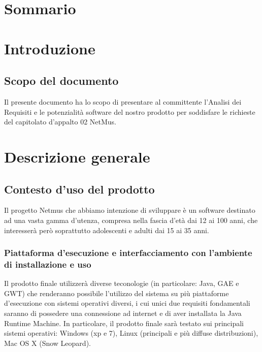 \tableofcontents
\thispagestyle{fancy} %


\chapter*{Sommario}


\thispagestyle{fancy} %

\chapter{Introduzione}
\thispagestyle{fancy} %

\section{Scopo del documento}
Il presente documento ha lo scopo di presentare al committente l'Analisi dei
Requisiti e le potenzialit\`a software del nostro prodotto per soddisfare le
richieste del capitolato d'appalto 02 NetMus.



\chapter{Descrizione generale}
\section{Contesto d'uso del prodotto}
Il progetto Netmus che abbiamo intenzione di sviluppare \`e un software
destinato ad una vasta gamma d'utenza, compresa nella fascia d'et\`a dai 12 ai
100 anni, che interesser\`a per\`o soprattutto adolescenti e adulti dai 15 ai 35 anni.
\subsection{Piattaforma d'esecuzione e interfacciamento con l'ambiente di
installazione e uso}
Il prodotto finale utilizzer\`a diverse teconologie (in particolare: Java, GAE e
GWT) che renderanno possibile l'utilizzo del sistema su pi\`u piattaforme
d'esecuzione con sistemi operativi diversi, i cui unici due requisiti
fondamentali saranno di possedere una connessione ad internet e di aver
installata la Java Runtime Machine. In particolare, il prodotto finale sar\`a
testato sui principali sistemi operativi: Windows (xp e 7), Linux (principali e
pi\`u diffuse distribuzioni), Mac OS X (Snow Leopard).
